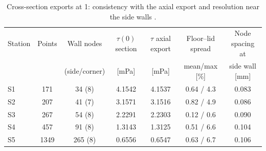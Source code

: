 \begin{table}[htbp]
\centering
\caption{Uniform-shear half-width $d$ at $\pm\SI{5}{\percent}$ \tagC, with theory \tagT\ (T2 at S1--S4, T3 at S5) and the sensitivity of $2d$ to the tolerance (\SI{1}{\uLmin}). Side layer $=w/2-d$.}
\label{tab:uniform}
\small
{}
\end{table}

\begin{table}[htbp]
\centering
\caption{Cross-section exports at \SI{1}{\uLmin}: consistency with the axial export and resolution near the side walls \tagC.}
\label{tab:transverse_nodes}
\small
\begin{tabular}{@{}lcccccc@{}}
\toprule
Station & Points & Wall nodes & $\tau(0)$ section & $\tau$ axial export & Floor--lid spread & Node spacing at\\
 & & (side/corner) & [mPa] & [mPa] & mean/max [\%] & side wall [mm]\\
\midrule
S1 & 171 & 34 (8) & 4.1542 & 4.1537 & 0.64 / 4.3 & 0.083\\
S2 & 207 & 41 (7) & 3.1571 & 3.1516 & 0.82 / 4.9 & 0.086\\
S3 & 267 & 54 (8) & 2.2291 & 2.2303 & 0.12 / 0.6 & 0.090\\
S4 & 457 & 91 (8) & 1.3143 & 1.3125 & 0.51 / 6.6 & 0.104\\
S5 & 1349 & 265 (8) & 0.6556 & 0.6547 & 0.63 / 6.7 & 0.106\\
\bottomrule
\end{tabular}
\end{table}

